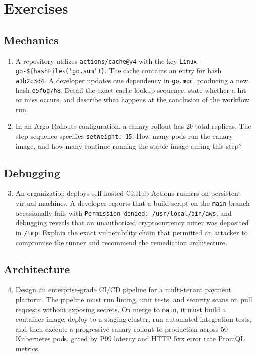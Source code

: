 \section{Exercises}

\subsection{Mechanics}
\begin{enumerate}[leftmargin=18pt]
  \item A repository utilizes \texttt{actions/cache@v4} with the key \texttt{Linux-go-\$\{hashFiles('go.sum')\}}. The cache contains an entry for hash \texttt{a1b2c3d4}. A developer updates one dependency in \texttt{go.mod}, producing a new hash \texttt{e5f6g7h8}. Detail the exact cache lookup sequence, state whether a hit or miss occurs, and describe what happens at the conclusion of the workflow run.
  \item In an Argo Rollouts configuration, a canary rollout has 20 total replicas. The step sequence specifies \texttt{setWeight: 15}. How many pods run the canary image, and how many continue running the stable image during this step?
\end{enumerate}

\subsection{Debugging}
\begin{enumerate}[leftmargin=18pt]
  \setcounter{enumi}{2}
  \item An organization deploys self-hosted GitHub Actions runners on persistent virtual machines. A developer reports that a build script on the \texttt{main} branch occasionally fails with \texttt{Permission denied: /usr/local/bin/aws}, and debugging reveals that an unauthorized cryptocurrency miner was deposited in \texttt{/tmp}. Explain the exact vulnerability chain that permitted an attacker to compromise the runner and recommend the remediation architecture.
\end{enumerate}

\subsection{Architecture}
\begin{enumerate}[leftmargin=18pt]
  \setcounter{enumi}{3}
  \item Design an enterprise-grade CI/CD pipeline for a multi-tenant payment platform. The pipeline must run linting, unit tests, and security scans on pull requests without exposing secrets. On merge to \texttt{main}, it must build a container image, deploy to a staging cluster, run automated integration tests, and then execute a progressive canary rollout to production across 50 Kubernetes pods, gated by P99 latency and HTTP 5xx error rate PromQL metrics.
\end{enumerate}


